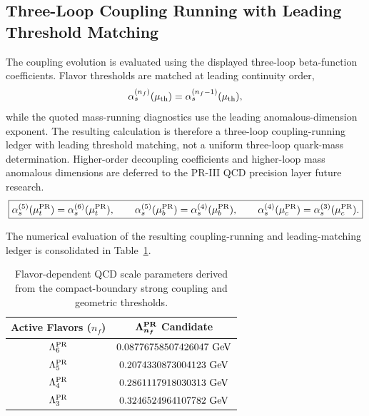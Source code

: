 \documentclass[11pt]{article}
\renewcommand{\arraystretch}{1.22}
\renewcommand{\arraystretch}{1.4}
\begin{document}
\subsection{Three-Loop Coupling Running with Leading Threshold Matching}
\label{sec:pr2_qcd_threshold_ledger}

The coupling evolution is evaluated using the displayed three-loop beta-function coefficients. Flavor thresholds are matched at leading
continuity order,
\begin{equation}
\alpha_s^{(n_f)}(\mu_{\rm th})
=
\alpha_s^{(n_f-1)}(\mu_{\rm th}),
\end{equation}
while the quoted mass-running diagnostics use the leading anomalous-dimension exponent. The resulting calculation is therefore a three-loop coupling-running ledger with leading threshold matching, not a uniform three-loop quark-mass determination. Higher-order decoupling coefficients and higher-loop mass anomalous dimensions are deferred to the PR-III QCD precision layer future research.
\begin{equation}
\boxed{
\alpha_s^{(5)}(\mu_t^{\rm PR}) = \alpha_s^{(6)}(\mu_t^{\rm PR}),
\qquad
\alpha_s^{(5)}(\mu_b^{\rm PR}) = \alpha_s^{(4)}(\mu_b^{\rm PR}),
\qquad
\alpha_s^{(4)}(\mu_c^{\rm PR}) = \alpha_s^{(3)}(\mu_c^{\rm PR}).
}
\end{equation}

The numerical evaluation of the resulting coupling-running and leading-matching ledger is consolidated in Table~\ref{tab:pr2_qcd_lambda_scales}.

\begin{table}[H]
\centering
\caption{Flavor-dependent QCD scale parameters derived from the compact-boundary strong coupling and geometric thresholds.}
\label{tab:pr2_qcd_lambda_scales}
\small
\renewcommand{\arraystretch}{1.25}
\begin{tabular}{cc}
\hline\hline
\textbf{Active Flavors (\(n_f\))} & \(\boldsymbol{\Lambda_{n_f}^{\rm PR}}\) \textbf{Candidate} \\ \hline
\(\Lambda_6^{\rm PR}\) & \(0.08776758507426047\ {\rm GeV}\) \\
\(\Lambda_5^{\rm PR}\) & \(0.2074330873004123\ {\rm GeV}\) \\
\(\Lambda_4^{\rm PR}\) & \(0.2861117918030313\ {\rm GeV}\) \\
\(\Lambda_3^{\rm PR}\) & \(0.3246524964107782\ {\rm GeV}\) \\ \hline\hline
\end{tabular}
\end{table}
\end{document}

